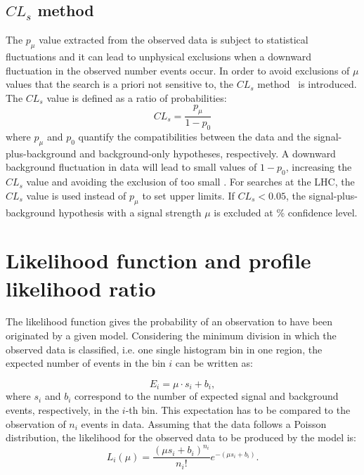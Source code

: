    \subsection{$CL_s$ method}
   \label{subsection:CLs_method}
   The $p_\mu$ value extracted from the observed data is subject to statistical fluctuations and it can lead to unphysical exclusions when a downward fluctuation in the observed number events occur.
   In order to avoid exclusions of $\mu$ values that the search is a priori not sensitive to, the $CL_s$ method~\cite{CLs} is introduced.
   The $CL_s$ value is defined as a ratio of probabilities:
   \begin{equation}
     \label{eq:CLS}
     CL_s=\frac{p_\mu}{1-p_0} %
   \end{equation}
   where $p_{\mu}$ and $p_0$ quantify the compatibilities between the data and the signal-plus-background and 
   background-only hypotheses, respectively. 
    A downward background fluctuation in data will lead to small values of $1-p_0$, increasing
    the $CL_s$ value and avoiding the exclusion of too small \xsecs. 
   For searches at the LHC, the $CL_s$ value is used instead of $p_\mu$ to set upper limits.
   If $CL_s < 0.05$, the signal-plus-background hypothesis with a signal strength $\mu$ is excluded at \unit[95]{\%} confidence level.
    
   \section{Likelihood function and profile likelihood ratio}
   The likelihood function gives the probability of an observation to have been originated by a given model. Considering the minimum division in which the observed data is classified, i.e. one single histogram bin in one region, the expected number of events in the bin $i$ can be written as:

    \begin{equation}
      \label{eq:expectation_bin}
      E_i = \mu \cdot s_i + b_i,
    \end{equation}
    where $s_i$ and $b_i$ correspond to the number of expected signal and background events, respectively, in the $i$-th bin.
    This expectation has to be compared to the observation of $n_i$ events in data. Assuming that the data follows a Poisson distribution, the likelihood for the observed data to be produced by the model is:
    \begin{equation}
      \label{eq:likelihood_bin}
      L_i(\mu)=\frac{(\mu s_i+b_i)^{n_i}}{n_i !}e^{-(\mu s_i+b_i)}.
    \end{equation}

